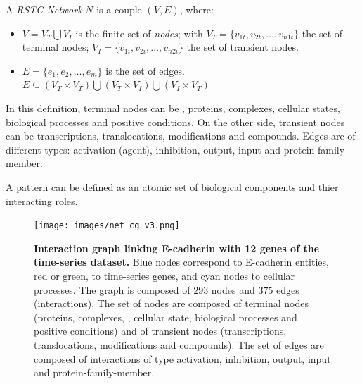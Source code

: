 \begin{definition} \label{def:RSTCDef}
A \emph{RSTC Network} $N$ is a couple $(V,E)$, where:
\begin{itemize}
\item $V =V_{T} \bigcup V_{I} $ is the finite set of \emph{nodes};
 with 
  $V_{T} = \{v_{1t},v_{2t}, \dots ,v_{n1t} \} $ the set of terminal nodes;
  $V_{I} = \{v_{1i},v_{2i}, \dots ,v_{n2i} \} $ the set of transient nodes.
\item $E = \{e_{1},e_{2}, \dots, e_{m} \}$ is the set of edges. $ E \subseteq (V_{T} \times V_{T}) \bigcup (V_{T} \times V_{I}) 
\bigcup (V_{I} \times V_{T})$
\end{itemize}
\end{definition}

In this definition, terminal nodes can be , proteins, complexes, cellular states, biological processes and positive conditions. 
On the other side, transient nodes can be transcriptions, translocations, modifications and compounds. Edges are of different types:
activation (agent), inhibition, output, input and protein-family-member.


\begin{definition}[Pattern] \label{def:pattern}

A pattern can be defined as an atomic set of biological components and thier interacting roles. 

\end{definition}


\begin{figure}[!p]
 \centering
 \texttt{[image: images/net\_cg\_v3.png]}
\caption{{\bf  Interaction graph linking E-cadherin with 12 genes of the time-series dataset.} Blue nodes correspond to E-cadherin entities, red or green, to time-series genes, 
and cyan nodes to cellular processes. The graph is composed of $293$ nodes and $375$ edges (interactions).
The set of nodes are composed of terminal nodes (proteins, complexes, , cellular state, biological processes and positive conditions) and of transient
nodes (transcriptions, translocations, modifications and compounds). The set of edges are composed of interactions of type activation, inhibition, output, 
input and protein-family-member.} 
 \label{fig:network}
\end{figure}

